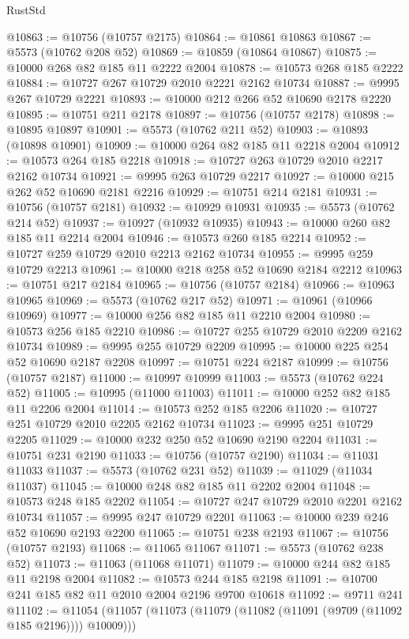 \begin{lexlean}{RustStd}
\begin{coremodule}
@10863 := @10756 (@10757 @2175)
@10864 := @10861 @10863
@10867 := @5573 (@10762 @208 @52)
@10869 := @10859 (@10864 @10867)
@10875 := @10000 @268 @82 @185 @11 @2222 @2004
@10878 := @10573 @268 @185 @2222
@10884 := @10727 @267 @10729 @2010 @2221 @2162 @10734
@10887 := @9995 @267 @10729 @2221
@10893 := @10000 @212 @266 @52 @10690 @2178 @2220
@10895 := @10751 @211 @2178
@10897 := @10756 (@10757 @2178)
@10898 := @10895 @10897
@10901 := @5573 (@10762 @211 @52)
@10903 := @10893 (@10898 @10901)
@10909 := @10000 @264 @82 @185 @11 @2218 @2004
@10912 := @10573 @264 @185 @2218
@10918 := @10727 @263 @10729 @2010 @2217 @2162 @10734
@10921 := @9995 @263 @10729 @2217
@10927 := @10000 @215 @262 @52 @10690 @2181 @2216
@10929 := @10751 @214 @2181
@10931 := @10756 (@10757 @2181)
@10932 := @10929 @10931
@10935 := @5573 (@10762 @214 @52)
@10937 := @10927 (@10932 @10935)
@10943 := @10000 @260 @82 @185 @11 @2214 @2004
@10946 := @10573 @260 @185 @2214
@10952 := @10727 @259 @10729 @2010 @2213 @2162 @10734
@10955 := @9995 @259 @10729 @2213
@10961 := @10000 @218 @258 @52 @10690 @2184 @2212
@10963 := @10751 @217 @2184
@10965 := @10756 (@10757 @2184)
@10966 := @10963 @10965
@10969 := @5573 (@10762 @217 @52)
@10971 := @10961 (@10966 @10969)
@10977 := @10000 @256 @82 @185 @11 @2210 @2004
@10980 := @10573 @256 @185 @2210
@10986 := @10727 @255 @10729 @2010 @2209 @2162 @10734
@10989 := @9995 @255 @10729 @2209
@10995 := @10000 @225 @254 @52 @10690 @2187 @2208
@10997 := @10751 @224 @2187
@10999 := @10756 (@10757 @2187)
@11000 := @10997 @10999
@11003 := @5573 (@10762 @224 @52)
@11005 := @10995 (@11000 @11003)
@11011 := @10000 @252 @82 @185 @11 @2206 @2004
@11014 := @10573 @252 @185 @2206
@11020 := @10727 @251 @10729 @2010 @2205 @2162 @10734
@11023 := @9995 @251 @10729 @2205
@11029 := @10000 @232 @250 @52 @10690 @2190 @2204
@11031 := @10751 @231 @2190
@11033 := @10756 (@10757 @2190)
@11034 := @11031 @11033
@11037 := @5573 (@10762 @231 @52)
@11039 := @11029 (@11034 @11037)
@11045 := @10000 @248 @82 @185 @11 @2202 @2004
@11048 := @10573 @248 @185 @2202
@11054 := @10727 @247 @10729 @2010 @2201 @2162 @10734
@11057 := @9995 @247 @10729 @2201
@11063 := @10000 @239 @246 @52 @10690 @2193 @2200
@11065 := @10751 @238 @2193
@11067 := @10756 (@10757 @2193)
@11068 := @11065 @11067
@11071 := @5573 (@10762 @238 @52)
@11073 := @11063 (@11068 @11071)
@11079 := @10000 @244 @82 @185 @11 @2198 @2004
@11082 := @10573 @244 @185 @2198
@11091 := @10700 @241 @185 @82 @11 @2010 @2004 @2196 @9700 @10618
@11092 := @9711 @241
@11102 := @11054 (@11057 (@11073 (@11079 (@11082 (@11091 (@9709 (@11092 @185 @2196)))) @10009)))

\end{coremodule}
\end{lexlean}
